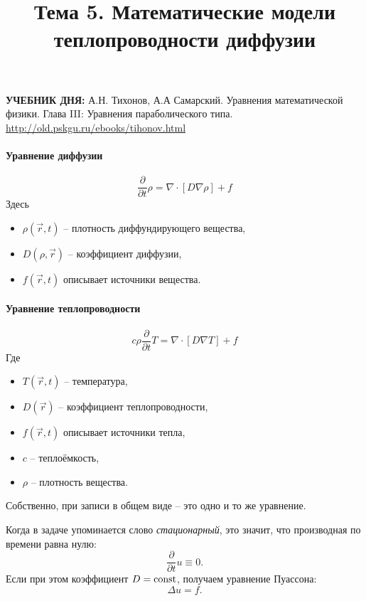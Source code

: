 \documentclass[12pt]{report}
\title{Тема 5. Математические модели теплопроводности диффузии}
\begin{document}
\maketitle

\begin{tcolorbox}
  \textbf{УЧЕБНИК ДНЯ:}
  А.Н. Тихонов, А.А Самарский. Уравнения математической физики.
  Глава III: Уравнения параболического типа.
  \url{http://old.pskgu.ru/ebooks/tihonov.html}
\end{tcolorbox}

\paragraph{Уравнение диффузии}
\begin{equation*}
  \frac{\partial}{\partial t}\rho = \nabla\cdot \left[D\nabla \rho\right] + f
\end{equation*}
Здесь 
\begin{itemize}
	\item  $\rho(\vec r,t)$ -- плотность диффундирующего вещества,
	\item $D(\rho, \vec	r)$ -- коэффициент диффузии,
	\item $f(\vec r,t)$ описывает источники вещества.
\end{itemize}

\paragraph{Уравнение теплопроводности}
\begin{equation*}
  c\rho\frac{\partial}{\partial t} T = \nabla\cdot\left[D \nabla T\right] + f
\end{equation*}
Где 
\begin{itemize}
	\item $T(\vec r, t)$ -- температура,
	\item $D(\vec r)$ -- коэффициент теплопроводности,
	\item $f(\vec r,t)$ описывает источники тепла,
	\item $c$ -- теплоёмкость,
	\item $\rho$ -- плотность вещества.
\end{itemize}

Собственно, при записи в общем виде -- это одно и то же уравнение.

\begin{rmk}
	Когда в задаче упоминается слово \emph{стационарный}, это значит, что производная по времени равна нулю:
	\[
	 	\frac{\partial}{\partial t} u \equiv 0.
	\]
	Если при этом коэффициент $D=\mathrm{const}$, получаем уравнение Пуассона:
	\[
	\Delta u = f.
	\]
\end{rmk}
\end{document}

